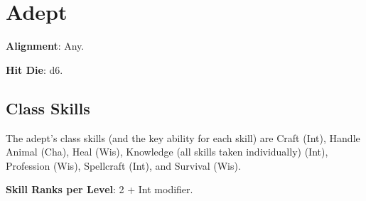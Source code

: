 \section{Adept}

\label{f0}				
\textbf{Alignment}: Any.
				
\textbf{Hit Die}: d6.
				
\subsection{Class Skills}

				
The adept's class skills (and the key ability for each skill) are Craft (Int), Handle Animal (Cha), Heal (Wis), Knowledge (all skills taken individually) (Int), Profession (Wis), Spellcraft (Int), and Survival (Wis). 
				
\textbf{Skill Ranks per Level}: 2 + Int modifier.

